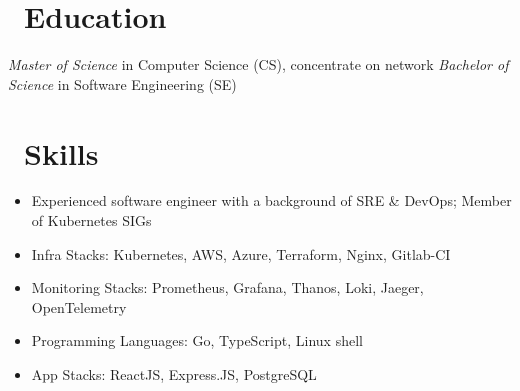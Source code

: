 \documentclass{resume}
\begin{document}



\section{\faGraduationCap\ Education}
\textit{Master of Science} in Computer Science (CS), concentrate on network
\textit{Bachelor of Science} in Software Engineering (SE)

\section{\faCogs\ Skills}
\begin{itemize}[parsep=0.5ex]
  \item Experienced software engineer with a background of SRE \& DevOps; Member of Kubernetes SIGs
  \item Infra Stacks: Kubernetes, AWS, Azure, Terraform, Nginx, Gitlab-CI
  \item Monitoring Stacks: Prometheus, Grafana, Thanos, Loki, Jaeger, OpenTelemetry
  \item Programming Languages: Go, TypeScript, Linux shell
  \item App Stacks: ReactJS, Express.JS, PostgreSQL
\end{itemize}
\end{document}
